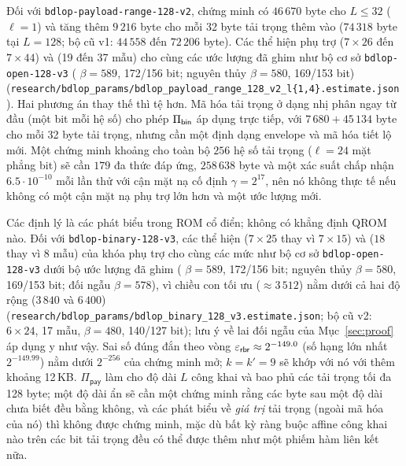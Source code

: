 Đối với \texttt{bdlop-payload-range-128-v2}, chứng minh có $46\,670$ byte cho
$L\le32$ ($\ell=1$) và tăng thêm $9\,216$ byte cho mỗi 32 byte tải trọng thêm
vào ($74\,318$ byte tại $L=128$; bộ cũ v1: $44\,558$ đến $72\,206$ byte). Các
thể hiện \MSIS{} phụ trợ ($7\times26$ đến $7\times44$) và \MLWE{} (19 đến 37
mẫu) cho cùng các ước lượng đã ghim như bộ cơ sở \texttt{bdlop-open-128-v3}
(\MSIS{} $\beta=589$, 172/156 bit; \MLWE{} nguyên thủy $\beta=580$, 169/153 bit)
(\texttt{research/bdlop\_params/bdlop\_payload\_range\_128\_v2\_l\{1,4\}.estimate.json}).
Hai phương án thay thế thì tệ hơn. Mã hóa tải trọng ở dạng nhị phân ngay từ đầu
(một bit mỗi hệ số) cho phép $\Pi_{\mathsf{bin}}$ áp dụng trực tiếp, với
$7\,680+45\,134$ byte cho mỗi 32 byte tải trọng, nhưng cần một định dạng
envelope và mã hóa tiết lộ mới. Một chứng minh khoảng cho toàn bộ $256$ hệ số
tải trọng ($\ell=24$ mặt phẳng bit) sẽ cần $179$ đa thức đáp ứng,
$258\,638$ byte và một xác suất chấp nhận $6.5\cdot10^{-10}$ mỗi lần thử
với cận mặt nạ cố định $\gamma=2^{17}$, nên nó không thực tế nếu không có một
cận mặt nạ phụ trợ lớn hơn và một ước lượng \MSIS{} mới.

\begin{remark}
Các định lý là các phát biểu trong ROM cổ điển; không có khẳng định QROM nào.
Đối với \texttt{bdlop-binary-128-v3}, các thể hiện \MSIS{} ($7\times25$ thay vì
$7\times15$) và \MLWE{}
($18$ thay vì $8$ mẫu) của khóa phụ trợ cho cùng các mức như bộ cơ sở
\texttt{bdlop-open-128-v3}
dưới bộ ước lượng đã ghim (\MSIS{} $\beta=589$, 172/156 bit; \MLWE{} nguyên thủy
$\beta=580$, 169/153 bit; đối ngẫu $\beta=578$), vì chiều con \MSIS{}
tối ưu ($\approx3\,512$) nằm dưới cả hai độ rộng ($3\,840$ và $6\,400$)
(\texttt{research/bdlop\_params/bdlop\_binary\_128\_v3.estimate.json}; bộ cũ v2:
$6\times24$, 17 mẫu, \MSIS{} $\beta=480$, 140/127 bit); lưu ý
về lai đối ngẫu của Mục~\ref{sec:proof} áp dụng y như vậy. Sai số đúng đắn
theo vòng $\varepsilon_{\mathsf{rbr}}\approx2^{-149.0}$ (số hạng lớn nhất $2^{-149.99}$) nằm dưới
$2^{-256}$ của chứng minh mở; $k=k'=9$ sẽ khớp
với nó với thêm khoảng 12\,KB. $\Pi_{\mathsf{pay}}$ làm cho độ dài $L$ công khai
và bao phủ các tải trọng tối đa 128 byte; một độ dài ẩn sẽ cần một chứng minh
rằng các byte sau một độ dài chưa biết đều bằng không, và các phát biểu về
\emph{giá trị} tải trọng (ngoài mã hóa của nó) thì không được chứng minh, mặc dù
bất kỳ ràng buộc affine công khai nào trên các bit tải trọng đều có thể được
thêm như một phiếm hàm liên kết nữa.
\end{remark}

